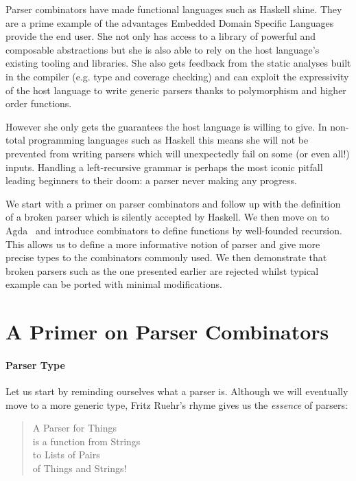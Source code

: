 \documentclass[sigplan,review,anonymous]{acmart}\settopmatter{printfolios=true}
\begin{document}
Parser combinators have made functional languages such as Haskell
shine. They are a prime example of the advantages Embedded Domain
Specific Languages provide the end user. She not only has access
to a library of powerful and composable abstractions but she is also
able to rely on the host language's existing tooling and libraries.
She also gets feedback from the static analyses built in the compiler
(e.g. type and coverage checking) and can exploit the expressivity
of the host language to write generic parsers thanks to polymorphism
and higher order functions.

However she only gets the guarantees the host language is willing
to give. In non-total programming languages such as Haskell this
means she will not be prevented from writing parsers which will
unexpectedly fail on some (or even all!) inputs. Handling a
left-recursive grammar is perhaps the most iconic pitfall leading
beginners to their doom: a parser never making any progress.

We start with a primer on parser combinators and follow up with the
definition of a broken parser which is silently accepted by Haskell.
We then move on to Agda~ and introduce combinators to
define functions by well-founded recursion. This allows us to define
a more informative notion of parser and give more precise types to
the combinators commonly used. We then demonstrate that broken parsers
such as the one presented earlier are rejected whilst typical example
can be ported with minimal modifications.

\section{A Primer on Parser Combinators}

\paragraph{Parser Type} Let us start by reminding ourselves what
a parser is. Although we will eventually move to a more generic
type, Fritz Ruehr's rhyme gives us the \emph{essence} of parsers:

\begin{verse}
  A Parser for Things\\
  is a function from Strings\\
  to Lists of Pairs\\
  of Things and Strings!
\end{verse}
\end{document}
